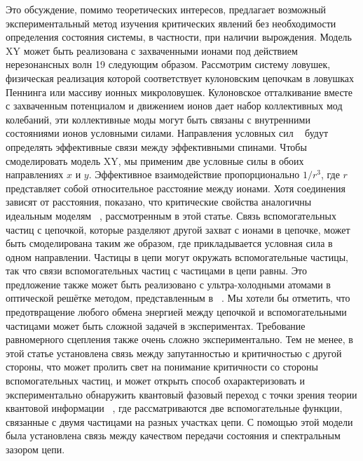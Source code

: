 \documentclass[11pt]{article}
\begin{document}
Это обсуждение, помимо теоретических интересов, предлагает возможный экспериментальный метод изучения критических явлений без необходимости определения состояния системы, в частности, при наличии вырождения. Модель XY может быть реализована с захваченными ионами под действием нерезонансных волн 19 следующим образом. Рассмотрим систему ловушек, физическая реализация которой соответствует кулоновским цепочкам в ловушках Пеннинга или массиву ионных микроловушек. Кулоновское отталкивание вместе с захваченным потенциалом и движением ионов дает набор коллективных мод колебаний, эти коллективные моды могут быть связаны с внутренними состояниями ионов условными силами. Направления условных сил ~\cite{b19} будут определять эффективные связи между эффективными спинами. Чтобы смоделировать модель XY, мы применим две условные силы в обоих направлениях $x$ и $y$. Эффективное взаимодействие пропорционально $1/r^3$, где $r$ представляет собой относительное расстояние между ионами. Хотя соединения зависят от расстояния, показано, что критические свойства аналогичны идеальным моделям ~\cite{b19,b27}, рассмотренным в этой статье. Связь вспомогательных частиц с цепочкой, которые разделяют другой захват с ионами в цепочке, может быть смоделирована таким же образом, где прикладывается условная сила в одном направлении. Частицы в цепи могут окружать вспомогательные частицы, так что связи вспомогательных частиц с частицами в цепи равны.
Это предложение также может быть реализовано с ультра-холодными атомами в оптической решётке методом, представленным в ~\cite{b28}. Мы хотели бы отметить, что предотвращение любого обмена энергией между цепочкой и вспомогательными частицами может быть сложной задачей в экспериментах. Требование равномерного сцепления также очень сложно экспериментально. Тем не менее, в этой статье установлена связь между запутанностью и критичностью с другой стороны, что может пролить свет на понимание критичности со стороны вспомогательных частиц, и может открыть способ охарактеризовать и экспериментально обнаружить квантовый фазовый переход с точки зрения теории квантовой информации ~\cite{b29}, где рассматриваются две вспомогательные функции, связанные с двумя частицами на разных участках цепи. С помощью этой модели была установлена связь между качеством передачи состояния и спектральным зазором цепи.
\end{document}
